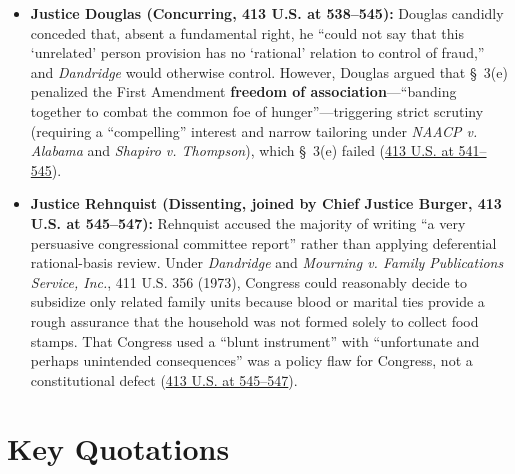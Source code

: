 \documentclass[12pt]{article}
\begin{document}
\begin{itemize}
  \item \textbf{Justice Douglas (Concurring, 413 U.S. at 538--545):} Douglas candidly conceded that, absent a fundamental right, he ``could not say that this `unrelated' person provision has no `rational' relation to control of fraud,'' and \textit{Dandridge} would otherwise control. However, Douglas argued that \S~3(e) penalized the First Amendment \textbf{freedom of association}---``banding together to combat the common foe of hunger''---triggering strict scrutiny (requiring a ``compelling'' interest and narrow tailoring under \textit{NAACP v. Alabama} and \textit{Shapiro v. Thompson}), which \S~3(e) failed (\href{https://supreme.justia.com/cases/federal/us/413/528/}{413 U.S. at 541--545}).
  \item \textbf{Justice Rehnquist (Dissenting, joined by Chief Justice Burger, 413 U.S. at 545--547):} Rehnquist accused the majority of writing ``a very persuasive congressional committee report'' rather than applying deferential rational-basis review. Under \textit{Dandridge} and \textit{Mourning v. Family Publications Service, Inc.}, 411 U.S. 356 (1973), Congress could reasonably decide to subsidize only related family units because blood or marital ties provide a rough assurance that the household was not formed solely to collect food stamps. That Congress used a ``blunt instrument'' with ``unfortunate and perhaps unintended consequences'' was a policy flaw for Congress, not a constitutional defect (\href{https://supreme.justia.com/cases/federal/us/413/528/}{413 U.S. at 545--547}).
\end{itemize}

\section{Key Quotations}
\end{document}
